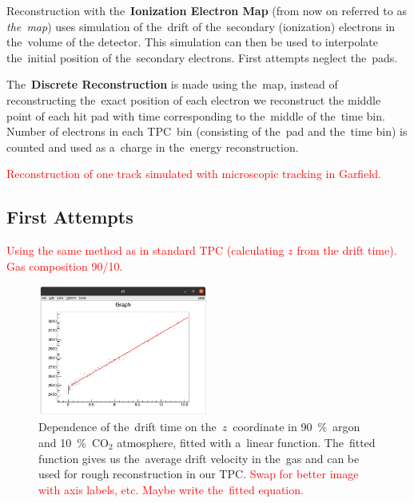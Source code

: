 \documentclass[]{article}
\begin{document}
		Reconstruction with the~\textbf{Ionization Electron Map} (from now on referred to as \emph{the~map}) uses simulation of the~drift of the~secondary (ionization) electrons in the~volume of the detector. This simulation can then be used to interpolate the~initial position of the~secondary electrons. First attempts neglect the~pads.
		
		The~\textbf{Discrete Reconstruction} is made using the~map, instead of reconstructing the~exact position of each electron we reconstruct the middle point of each hit pad with time corresponding to the~middle of the~time bin. Number of electrons in each TPC~bin (consisting of the~pad and the~time bin) is counted and used as a~charge in the~energy reconstruction.
		
		\textcolor{red}{Reconstruction of one track simulated with microscopic tracking in Garfield.}
		
		\subsection{First Attempts}
			\textcolor{red}{Using the same method as in standard TPC (calculating $z$ from the drift time). Gas composition 90/10.}
			
			\begin{figure}
				\centering
				\includegraphics[width=0.5\textwidth]{9010_zt.png}
				\caption{Dependence of the~drift time on the~$z$~coordinate in 90~\%~argon and 10~\%~CO$_2$ atmosphere, fitted with a~linear function. The~fitted function gives us the~average drift velocity in the~gas and can be used for rough reconstruction in our TPC. \textcolor{red}{Swap for better image with axis labels, etc. Maybe write the~fitted equation.}}
				\label{fig:9010zt}
			\end{figure}
			
\end{document}
